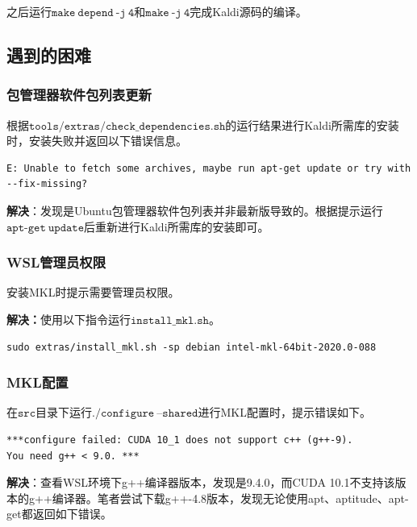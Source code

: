 \documentclass[a4paper]{article}
\begin{document}
之后运行$\mathtt{make\ depend\ \text{-}j\ 4}$和$\mathtt{make\ \text{-}j\ 4}$完成Kaldi源码的编译。



\subsection{遇到的困难}

\subsubsection{包管理器软件包列表更新}

根据$\mathtt{tools/extras/check\_dependencies.sh}$的运行结果进行Kaldi所需库的安装时，安装失败并返回以下错误信息。

\begin{lstlisting}
E: Unable to fetch some archives, maybe run apt-get update or try with --fix-missing?
\end{lstlisting}

    \textbf{解决}：发现是Ubuntu包管理器软件包列表并非最新版导致的。根据提示运行$\mathtt{apt\text{-}get\ update}$后重新进行Kaldi所需库的安装即可。

\subsubsection{WSL管理员权限}
    安装MKL时提示需要管理员权限。
    
    \textbf{解决：}使用以下指令运行$\mathtt{install\_mkl.sh}$。
    
\begin{lstlisting}
sudo extras/install_mkl.sh -sp debian intel-mkl-64bit-2020.0-088
\end{lstlisting}

\subsubsection{MKL配置}
    在$\mathtt{src}$目录下运行$\mathtt{./configure\ \text{--}shared}$进行MKL配置时，提示错误如下。
    
\begin{lstlisting}
***configure failed: CUDA 10_1 does not support c++ (g++-9).
You need g++ < 9.0. ***
\end{lstlisting}

\textbf{解决}：查看WSL环境下g++编译器版本，发现是9.4.0，而CUDA 10.1不支持该版本的g++编译器。笔者尝试下载g++-4.8版本，发现无论使用apt、aptitude、apt-get都返回如下错误。
\end{document}
